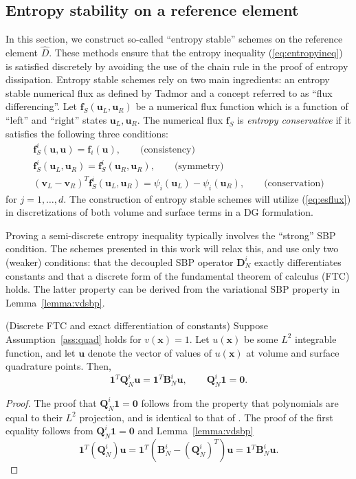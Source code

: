 \documentclass[review]{siamart0216}
\theoremstyle{assumption}
\renewcommand{\hat}[1]{\hat{#1}}
\newcommand{\LRp}[1]{\left( #1 \right)}
\renewcommand{\hat}{\widehat}
\begin{document}
\subsection{Entropy stability on a reference element}
\label{sec:singleelem}

In this section, we construct so-called ``entropy stable'' schemes on the reference element $\hat{D}$.  These methods ensure that the entropy inequality (\ref{eq:entropyineq}) is satisfied discretely by avoiding the use of the chain rule in the proof of entropy dissipation.  Entropy stable schemes rely on two main ingredients: an entropy stable numerical flux as defined by Tadmor \cite{tadmor1987numerical} and a concept referred to as ``flux differencing''.  Let $\bm{f}_S\LRp{\bm{u}_L,\bm{u}_R}$ be a numerical flux function which is a function of ``left'' and ``right'' states $\bm{u}_L,\bm{u}_R$.  The numerical flux $\bm{f}_S$ is \textit{entropy conservative} if it satisfies the following three conditions:  
\begin{gather}
\bm{f}^i_S(\bm{u},\bm{u}) = \bm{f}_i(\bm{u}), \qquad \text{(consistency)}\\
\bm{f}^i_S(\bm{u}_L,\bm{u}_R) = \bm{f}^i_S(\bm{u}_R,\bm{u}_R), \qquad \text{(symmetry)}\nonumber\\
\LRp{\bm{v}_L-\bm{v}_R}^T\bm{f}^i_S(\bm{u}_L,\bm{u}_R) = \psi_i(\bm{u}_L) - \psi_i(\bm{u}_R), \qquad \text{(conservation)}\nonumber
\label{eq:esflux}
\end{gather}
for $j = 1,\ldots, d$.  The construction of entropy stable schemes will utilize (\ref{eq:esflux}) in discretizations of both volume and surface terms in a DG formulation.  

Proving a semi-discrete entropy inequality typically involves the ``strong'' SBP condition.  The schemes presented in this work will relax this, and use only two (weaker) conditions: that the decoupled SBP operator $\bm{D}^i_N$ exactly differentiates constants and that a discrete form of the fundamental theorem of calculus (FTC) holds.  The latter property can be derived from the variational SBP property in Lemma~\ref{lemma:vdsbp}.

\begin{lemma}{(Discrete FTC and exact differentiation of constants)}
\label{lemma:sbpcor}
Suppose Assumption~\ref{ass:quad} holds for $v(\bm{x}) = 1$.  
Let $u(\bm{x})$ be some $L^2$ integrable function, and let $\bm{u}$ denote the vector of values of $u(\bm{x})$ at volume and surface quadrature points. Then, 
\[
\bm{1}^T\bm{Q}^i_N\bm{u} = \bm{1}^T\bm{B}^i_N\bm{u}, \qquad \bm{Q}^i_N\bm{1} = \bm{0}.
\]
\end{lemma}
\begin{proof}
The proof that $\bm{Q}^i_N \bm{1} = \bm{0}$ follows from the property that polynomials are equal to their $L^2$ projection, and is identical to that of \cite{chan2017discretely,chan2018discretely}.     The proof of the first equality follows from $\bm{Q}^i_N \bm{1} = \bm{0}$ and Lemma~\ref{lemma:vdsbp} 
\[
\bm{1}^T\LRp{\bm{Q}^i_N}\bm{u} = \bm{1}^T\LRp{\bm{B}^i_N - \LRp{\bm{Q}^i_N}^T}\bm{u} = \bm{1}^T{\bm{B}^i_N}\bm{u}.
\]
\end{proof}
\end{document}
